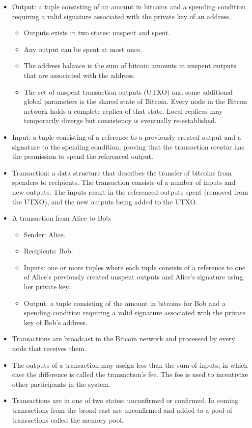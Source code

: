 \documentclass{article}
\begin{document}
\begin{itemize}
  \item Output: a tuple consisting of an amount in bitcoins and a spending
    condition requiring a valid signature associated with the private key of an
    address.
    \begin{itemize}
      \item Outputs exists in two states: unspent and spent.
      \item Any output can be spent at most once.
      \item The address balance is the sum of bitcoin amounts in unspent outputs
        that are associated with the address.
      \item The set of unspent transaction outputs (UTXO) and some additional
        global parameters is the shared state of Bitcoin. Every node in the
        Bitcon network holds a complete replica of that state. Local replicas
        may temporarily diverge but consistency is eventually re-established.
    \end{itemize}
  \item Input: a tuple consisting of a reference to a previously created output
    and a signature to the spending condition, proving that the transaction
    creator has the permission to spend the referenced output.
  \item Transaction: a data structure that describes the transfer of bitcoins
    from spenders to recipients. The transaction consists of a number of inputs
    and new outputs. The inputs result in the referenced outputs spent (removed
    from the UTXO), and the new outputs being added to the UTXO.\@
  \item A transaction from Alice to Bob:
    \begin{itemize}
      \item Sender: Alice.
      \item Recipients: Bob.
      \item Inputs: one or more tuples where each tuple consists of a reference
        to one of Alice's previously created unspent outputs and Alice's
        signature using her private key.
      \item Output: a tuple consisting of the amount in bitcoins for Bob and a
        spending condition requiring a valid signature associated with the
        private key of Bob's address.
    \end{itemize}
  \item Transactions are broadcast in the Bitcoin network and processed by every
    node that receives them.
  \item The outputs of a transaction may assign less than the sum of inputs, in
    which case the difference is called the transaction's fee. The fee is used
    to incentivize other participants in the system.
  \item Transactions are in one of two states: unconfirmed or confirmed. In
    coming transactions from the broad cast are unconfirmed and added to a pool
    of transactions called the memory pool.
\end{itemize}
\end{document}
